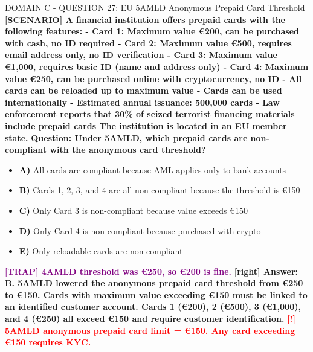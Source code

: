 \documentclass[11pt,a4paper]{beamer}
\newcommand{\redflag}[1]{\textcolor{red}{\textbf{[!] #1}}}
\newcommand{\trap}[1]{\textcolor{purple}{\textbf{[TRAP] #1}}}
\newcommand{\correct}[1]{\textcolor{green!50!black}{\textbf{[right] #1}}}
\newcommand{\scenario}[1]{\textcolor{blue!70!black}{\textbf{[SCENARIO] #1}}}
\newcommand{\option}[1]{\textcolor{black}{\textbf{#1}}}
\begin{document}
\begin{frame}{DOMAIN C - QUESTION 27: EU 5AMLD Anonymous Prepaid Card Threshold}
\scenario{A financial institution offers prepaid cards with the following features:
- Card 1: Maximum value €200, can be purchased with cash, no ID required
- Card 2: Maximum value €500, requires email address only, no ID verification
- Card 3: Maximum value €1,000, requires basic ID (name and address only)
- Card 4: Maximum value €250, can be purchased online with cryptocurrency, no ID
- All cards can be reloaded up to maximum value
- Cards can be used internationally
- Estimated annual issuance: 500,000 cards
- Law enforcement reports that 30\% of seized terrorist financing materials include prepaid cards
The institution is located in an EU member state.}
\vspace{0.2cm}
\textbf{Question: Under 5AMLD, which prepaid cards are non-compliant with the anonymous card threshold?}
\vspace{0.1cm}
\begin{itemize}
    \item \option{A)} All cards are compliant because AML applies only to bank accounts
    \item \option{B)} Cards 1, 2, 3, and 4 are all non-compliant because the threshold is €150
    \item \option{C)} Only Card 3 is non-compliant because value exceeds €150
    \item \option{D)} Only Card 4 is non-compliant because purchased with crypto
    \item \option{E)} Only reloadable cards are non-compliant
\end{itemize}
\vspace{0.2cm}
\trap{4AMLD threshold was €250, so €200 is fine.}
\correct{Answer: B. 5AMLD lowered the anonymous prepaid card threshold from €250 to €150. Cards with maximum value exceeding €150 must be linked to an identified customer account. Cards 1 (€200), 2 (€500), 3 (€1,000), and 4 (€250) all exceed €150 and require customer identification.}
\redflag{5AMLD anonymous prepaid card limit = €150. Any card exceeding €150 requires KYC.}
\end{frame}
\end{document}
